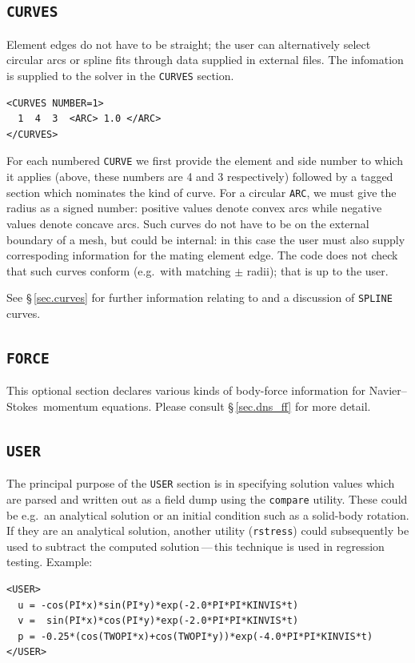 \documentclass[11pt]{report}
\newcommand{\eg}{e.g.\ } \newcommand{\CC}{\mathrm{c.c.}}
\newcommand\NavSto{Navier--Stokes}
\begin{document}
\subsection{\texttt{CURVES}}
\label{sec.curvess}

Element edges do not have to be straight; the user can alternatively
select circular arcs or spline fits through data supplied in external
files.  The infomation is supplied to the solver in the \verb|CURVES|
section.
%
{\small
\begin{verbatim}
<CURVES NUMBER=1>
  1  4  3  <ARC> 1.0 </ARC>
</CURVES>
\end{verbatim}
}
%
For each numbered \verb|CURVE| we first provide the element and side
number to which it applies (above, these numbers are 4 and 3
respectively) followed by a tagged section which nominates the kind of
curve.  For a circular \verb|ARC|, we must give the radius as a signed
number: positive values denote convex arcs while negative values
denote concave arcs.  Such curves do not have to be on the external
boundary of a mesh, but could be internal: in this case the user must
also supply correspoding information for the mating element edge.  The
code does not check that such curves conform (\eg with matching $\pm$
radii); that is up to the user.

See \S\,\ref{sec.curves} for further information relating to and a
discussion of \verb|SPLINE| curves.

\subsection{\texttt{FORCE}}
\label{sec.force}

This optional section declares various kinds of body-force information
for \NavSto\ momentum equations.  Please consult \S\,\ref{sec.dns_ff}
for more detail.

\subsection{\texttt{USER}}
\label{sec.user}

The principal purpose of the \verb|USER| section is in specifying
solution values which are parsed and written out as a field dump using
the \verb|compare| utility.  These could be \eg an analytical solution
or an initial condition such as a solid-body rotation.  If they are an
analytical solution, another utility (\verb|rstress|) could
subsequently be used to subtract the computed solution\,---\,this
technique is used in regression testing. Example:
%
{\small
\begin{verbatim}
<USER>
  u = -cos(PI*x)*sin(PI*y)*exp(-2.0*PI*PI*KINVIS*t)
  v =  sin(PI*x)*cos(PI*y)*exp(-2.0*PI*PI*KINVIS*t)
  p = -0.25*(cos(TWOPI*x)+cos(TWOPI*y))*exp(-4.0*PI*PI*KINVIS*t)
</USER>
\end{verbatim}
}
\end{document}
